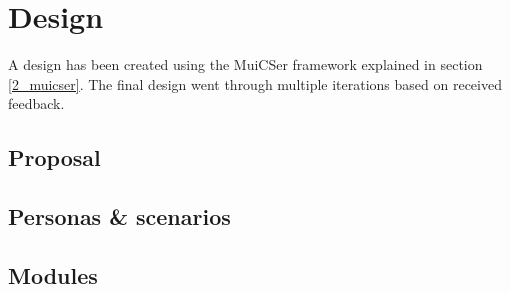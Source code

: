 \section{Design}
    
A design has been created using the MuiCSer framework explained in section \ref{2_muicser}. The final design went through multiple iterations based on received feedback.

    \subsection{Proposal}

    \subsection{Personas \& scenarios}

    \subsection{Modules}

    